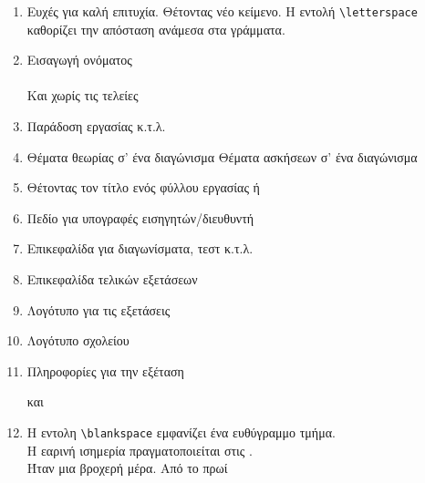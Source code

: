 \documentclass[12pt,a4page]{article}
\begin{document}
\begin{enumerate}
\item Ευχές για καλή επιτυχία.
  \wish
  Θέτοντας νέο κείμενο. Η εντολή \verb/\letterspace/ καθορίζει την απόσταση ανάμεσα στα γράμματα.
  \makeatletter
  \def\schl@wish{\letterspace ΚΑΛΗ ΤΥΧΗ}
  \makeatother
  \wish
\item Εισαγωγή ονόματος\hspace{2em} \fullname\\
  \datefield \\
  Και χωρίς τις τελείες \hspace{3em} \fullname[0]\\ \datefield[0]
\item Παράδοση εργασίας κ.τ.λ. \hspace{3em} \\
\item Θέματα θεωρίας σ' ένα διαγώνισμα \theorypart
  Θέματα ασκήσεων σ' ένα διαγώνισμα \exercisepart
\item Θέτοντας τον τίτλο ενός φύλλου εργασίας
  \worksheettitle{}
  ή
\item Πεδίο για υπογραφές εισηγητών/διευθυντή\\
  \hfill
\item Επικεφαλίδα για διαγωνίσματα, τεστ κ.τ.λ.
  \examtitle{}
\item Επικεφαλίδα τελικών εξετάσεων
\item Λογότυπο για τις εξετάσεις
\item Λογότυπο σχολείου\\ \schoollogo
\item Πληροφορίες για την εξέταση\\
  \hfill{}

  και

  \hfill\examdetailsii{}
\item Η εντολη \verb*/\blankspace/ εμφανίζει ένα ευθύγραμμο τμήμα. \\
  Η εαρινή ισημερία πραγματοποιείται στις \blankspace{10em}.\\
  Ήταν μια βροχερή μέρα. Από το πρωί \blankspace[-1ex]{3em}\\
  \\
\end{enumerate}
\end{document}
